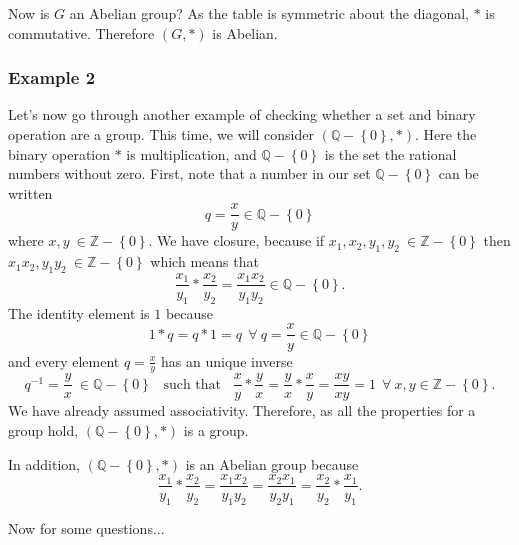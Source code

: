 Now is $G$ an Abelian group? As the table is symmetric about the diagonal, $*$ is commutative. Therefore $(G,*)$ is Abelian.\\

\subsubsection*{Example 2}
Let's now go through another example of checking whether a set and binary operation are a group. This time, we will consider $(\mathbb{Q} - \left\{ 0 \right\},*)$. Here the binary operation $*$ is multiplication, and $\mathbb{Q} - \left\{ 0 \right\}$ is the set the rational numbers without zero. First, note that a number in our set $\mathbb{Q} - \left\{ 0 \right\}$ can be written
\begin{equation*}
 q=\frac{x}{y}\in \mathbb{Q} - \left\{ 0 \right\}
\end{equation*}
where $x,y\:\in\mathbb{Z}- \left\{ 0 \right\}$. We have closure, because if $x_{1},x_{2},y_{1},y_{2}\: \in \mathbb{Z} - \left\{ 0 \right\}$ then $x_{1}x_{2},  y_{1}y_{2}\: \in \mathbb{Z} - \left\{ 0 \right\}$ which means that
\begin{equation*}
 \frac{x_{1}}{y_{1}}*\frac{x_{2}}{y_{2}}=\frac{x_{1}x_{2}}{y_{1}y_{2}} \in \mathbb{Q}- \left\{ 0 \right\}.
\end{equation*}
The identity element is $1$ because
\begin{equation*}
 1*q=q*1=q~~\forall \: q=\frac{x}{y}\in \mathbb{Q}- \left\{ 0 \right\}
\end{equation*}
and every element $q=\frac{x}{y}$ has an unique inverse 
\begin{equation*}
 q^{-1}=\frac{y}{x}\:\in\mathbb{Q}- \left\{ 0 \right\}\hspace{10pt}\text{such that}\hspace{10pt}\frac{x}{y}*\frac{y}{x}=\frac{y}{x}*\frac{x}{y}=\frac{xy}{xy}=1 ~~\forall \: x,y \in \mathbb{Z}- \left\{ 0 \right\}.
\end{equation*}
We have already assumed associativity. Therefore, as all the properties for a group hold, $(\mathbb{Q} - \left\{ 0 \right\},*)$ is a group.

In addition, $(\mathbb{Q} - \left\{ 0 \right\},*)$ is an Abelian group because
\begin{equation*}
 \frac{x_{1}}{y_{1}}*\frac{x_{2}}{y_{2}}=\frac{x_{1}x_{2}}{y_{1}y_{2}}=\frac{x_{2}x_{1}}{y_{2}y_{1}}=\frac{x_{2}}{y_{2}}*\frac{x_{1}}{y_{1}}.
\end{equation*}

Now for some questions...